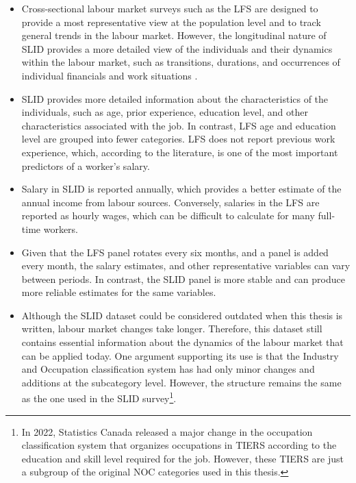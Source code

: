 \begin{itemize}
    \item Cross-sectional labour market surveys such as the LFS are designed to provide a most representative view at the population level and to track general trends in the labour market. However, the longitudinal nature of SLID provides a more detailed view of the individuals and their dynamics within the labour market, such as transitions, durations, and occurrences of individual financials and work situations \citep{StatsCAN2012}.

    \item SLID provides more detailed information about the characteristics of the individuals, such as age, prior experience, education level, and other characteristics associated with the job. In contrast, LFS age and education level are grouped into fewer categories. LFS does not report previous work experience, which, according to the literature, is one of the most important predictors of a worker's salary. 
    
    \item Salary in SLID is reported annually, which provides a better estimate of the annual income from labour sources. Conversely, salaries in the LFS are reported as hourly wages, which can be difficult to calculate for many full-time workers. 
    
    \item Given that the LFS panel rotates every six months, and a panel is added every month, the salary estimates, and other representative variables can vary between periods. In contrast, the SLID panel is more stable and can produce more reliable estimates for the same variables. 
    
    \item Although the SLID dataset could be considered outdated when this thesis is written, labour market changes take longer. Therefore, this dataset still contains essential information about the dynamics of the labour market that can be applied today. One argument supporting its use is that the Industry and Occupation classification system has had only minor changes and additions at the subcategory level. However, the structure remains the same as the one used in the SLID survey\footnote{In 2022, Statistics Canada released a major change in the occupation classification system that organizes occupations in TIERS according to the education and skill level required for the job. However, these TIERS are just a subgroup of the original NOC categories used in this thesis.}. 
\end{itemize}

